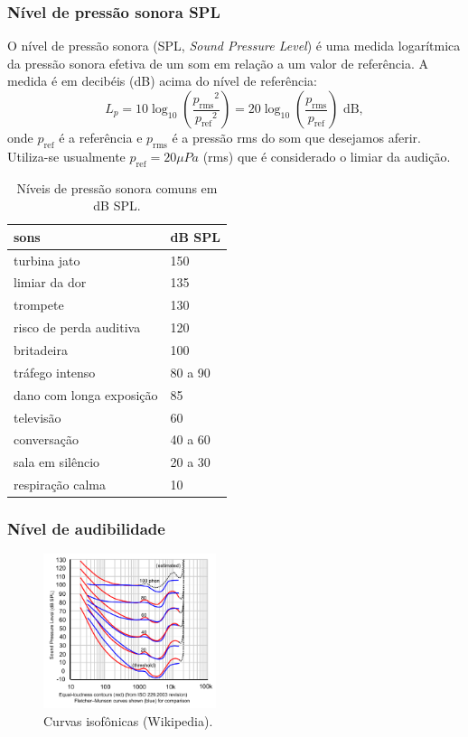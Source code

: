 \begin{frame}[allowframebreaks]
  \frametitle{Nível de pressão sonora SPL}
  O nível de pressão sonora (SPL, \textit{Sound Pressure Level}) é uma medida logarítmica 
  da pressão sonora efetiva de um som em relação a um valor de referência. A medida é em decibéis (dB)
  acima do nível de referência:
  \begin{equation}
  L_p=10 \log_{10}\left(\frac{{p_{\mathrm{{rms}}}}^2}{{p_{\mathrm{ref}}}^2}\right) =20 \log_{10}\left(\frac{p_{\mathrm{rms}}}{p_{\mathrm{ref}}}\right)\mbox{ dB} ,
  \end{equation}
  onde $p_{\mathrm{ref}}$ é a referência e $p_{\mathrm{rms}}$ é a pressão rms do som que desejamos aferir.
  Utiliza-se usualmente $p_{\mathrm{ref}} = 20 \mu Pa$ (rms) que é considerado o limiar da audição.

  \framebreak

  \begin{table}[h]
  \caption{Níveis de pressão sonora comuns em dB SPL.}\label{tab-spl}
  \begin{tabular}{ll}
  sons                     & dB SPL  \\ \hline
  turbina jato             & 150     \\
  limiar da dor            & 135     \\
  trompete                 & 130     \\
  risco de perda auditiva  & 120     \\
  britadeira               & 100     \\
  tráfego intenso          & 80 a 90 \\
  dano com longa exposição & 85      \\
  televisão                & 60      \\
  conversação              & 40 a 60 \\
  sala em silêncio         & 20 a 30 \\
  respiração calma         & 10     
  \end{tabular}
  \end{table}
\end{frame}


\begin{frame}[allowframebreaks]
  \frametitle{Nível de audibilidade}
  \vspace{-4ex}
  \begin{figure}[h]
  \centering
  \includegraphics[width=0.45\textwidth]{images/fetchermunson.pdf}
  \caption{Curvas isofônicas (Wikipedia).}
  \label{fig-fetchermunson}
  \end{figure}
\end{frame}

